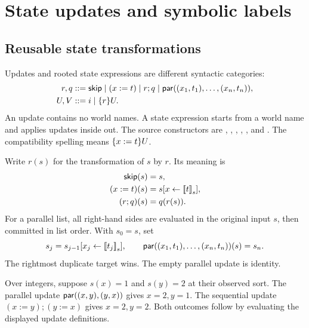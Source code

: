 \section{State updates and symbolic labels}\label{sec:updates}

\subsection{Reusable state transformations}
Updates and rooted state expressions are different syntactic categories:
\begin{align*}
 r,q&\mathrel{::=}\mathsf{skip}\mid (x:=t)\mid r;q
           \mid\mathsf{par}((x_1,t_1),\ldots,(x_n,t_n)),\\
 U,V&\mathrel{::=} i\mid\{r\}U.
\end{align*}
An update contains no world names. A state expression starts from a world
name and applies updates inside out. The source constructors are
, , , , , and
. The compatibility spelling  means
$\{x:=t\}U$.

Write $r(s)$ for the transformation of $s$ by $r$. Its meaning is
\begin{align*}
 \mathsf{skip}(s)&=s,\\
 (x:=t)(s)&=s[x\leftarrow\mathopen{[\![}t\mathclose{]\!]}_{s}],\\
 (r;q)(s)&=q(r(s)).
\end{align*}
For a parallel list, all right-hand sides are evaluated in the original input
$s$, then committed in list order. With $s_0=s$, set
\[
 s_j=s_{j-1}[x_j\leftarrow\mathopen{[\![}t_j\mathclose{]\!]}_{s}],\qquad
 \mathsf{par}((x_1,t_1),\ldots,(x_n,t_n))(s)=s_n.
\]
The rightmost duplicate target wins. The empty parallel update is identity.

\begin{example}
Over integers, suppose $s(x)=1$ and $s(y)=2$ at their observed sort.
The parallel update $\mathsf{par}((x,y),(y,x))$ gives $x=2,y=1$.
The sequential update $(x:=y);(y:=x)$ gives $x=2,y=2$.
Both outcomes follow by evaluating the displayed update definitions.
\end{example}

